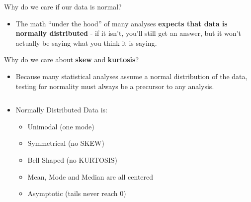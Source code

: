 \documentclass[
  ignorenonframetext,
]{beamer}
\providecommand{\tightlist}{%
  \setlength{\itemsep}{0pt}\setlength{\parskip}{0pt}}
\begin{document}
\begin{frame}{Why do we care if our data is normal?}
\label{why-do-we-care-if-our-data-is-normal}
\begin{itemize}
\tightlist
\item
  The math ``under the hood'' of many analyses \textbf{expects that data
  is normally distributed} - if it isn't, you'll still get an answer,
  but it won't actually be saying what you think it is saying.
\end{itemize}
\end{frame}

\begin{frame}{Why do we care about \textbf{skew} and \textbf{kurtosis}?}
\label{why-do-we-care-about-skew-and-kurtosis}
\begin{itemize}
\tightlist
\item
  Because many statistical analyses assume a normal distribution of the
  data, testing for normality must always be a precursor to any
  analysis.
\end{itemize}

\begin{columns}[T]
\begin{column}{0.48\textwidth}
\begin{itemize}
\tightlist
\item
  Normally Distributed Data is:

  \begin{itemize}
  \tightlist
  \item
    Unimodal (one mode)\\
  \item
    Symmetrical (no SKEW)\\
  \item
    Bell Shaped (no KURTOSIS)\\
  \item
    Mean, Mode and Median are all centered\\
  \item
    Asymptotic (tails never reach 0)\\
  \end{itemize}
\end{itemize}
\end{column}


\end{columns}
\end{frame}
\end{document}

